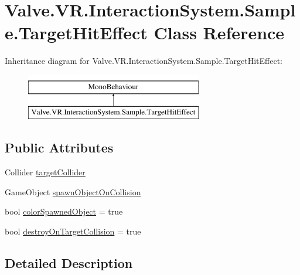 \hypertarget{class_valve_1_1_v_r_1_1_interaction_system_1_1_sample_1_1_target_hit_effect}{}\section{Valve.\+V\+R.\+Interaction\+System.\+Sample.\+Target\+Hit\+Effect Class Reference}
\label{class_valve_1_1_v_r_1_1_interaction_system_1_1_sample_1_1_target_hit_effect}
Inheritance diagram for Valve.\+V\+R.\+Interaction\+System.\+Sample.\+Target\+Hit\+Effect\+:\begin{figure}[H]
\begin{center}
\leavevmode
\includegraphics[height=2.000000cm]{class_valve_1_1_v_r_1_1_interaction_system_1_1_sample_1_1_target_hit_effect}
\end{center}
\end{figure}
\subsection*{Public Attributes}
\begin{DoxyCompactItemize}
\item 
Collider \mbox{\hyperlink{class_valve_1_1_v_r_1_1_interaction_system_1_1_sample_1_1_target_hit_effect_aafe4a35a98ead9da4f8803254c6424db}{target\+Collider}}
\item 
Game\+Object \mbox{\hyperlink{class_valve_1_1_v_r_1_1_interaction_system_1_1_sample_1_1_target_hit_effect_a244704587b7af61f4f4db6a468d3ba15}{spawn\+Object\+On\+Collision}}
\item 
bool \mbox{\hyperlink{class_valve_1_1_v_r_1_1_interaction_system_1_1_sample_1_1_target_hit_effect_a5c11a940cab930d25512640b536fab62}{color\+Spawned\+Object}} = true
\item 
bool \mbox{\hyperlink{class_valve_1_1_v_r_1_1_interaction_system_1_1_sample_1_1_target_hit_effect_a3d2c45d41716edeeefdc0ea10c7a0db9}{destroy\+On\+Target\+Collision}} = true
\end{DoxyCompactItemize}


\subsection{Detailed Description}


